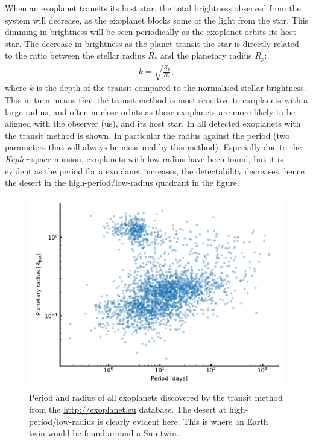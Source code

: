 When an exoplanet transits its host star, the total brightness observed from the system will
decrease, as the exoplanet blocks some of the light from the star. This dimming in brightness will
be seen periodically as the exoplanet orbits its host star. The decrease in brightness as the planet
transit the star is directly related to the ratio between the stellar radius $R_\ast$ and the
planetary radius $R_p$:
\begin{align}
  k = \sqrt{\frac{R_p}{R_\ast}},  \label{eq:transit}
\end{align}
where $k$ is the depth of the transit compared to the normalised stellar brightness. This in turn
means that the transit method is most sensitive to exoplanets with a large radius, and often in
close orbits as these exoplanets are more likely to be aligned with the observer (us), and its host
star. In  all detected exoplanets with the transit method is shown. In
particular the radius against the period (two parameters that will always be measured by this
method). Especially due to the \emph{Kepler} space mission, exoplanets with low radius have been
found, but it is evident as the period for a exoplanet increases, the detectability decreases, hence
the desert in the high-period/low-radius quadrant in the figure.

\begin{figure}[htpb!]
    \centering
    \includegraphics[width=1.0\linewidth]{figures/transitAll.pdf}
    \caption{Period and radius of all exoplanets discovered by the transit method from the
             \url{http://exoplanet.eu} database. The desert at high-period/low-radius is clearly
             evident here. This is where an Earth twin would be found around a Sun twin.}
    \label{fig:transitAll}
\end{figure}

